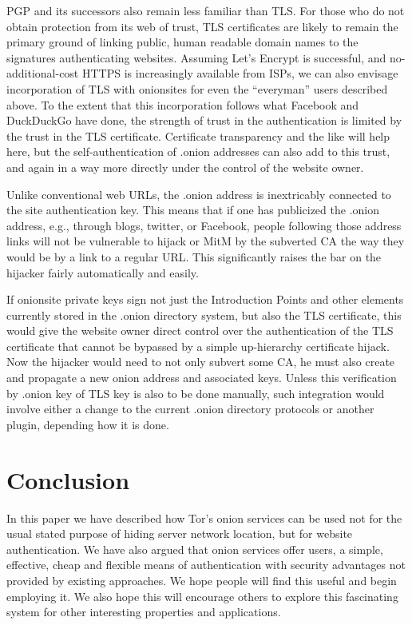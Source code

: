 \documentclass[10pt, conference, compsocconf]{styles/IEEEtran}
\begin{document}
PGP and its successors also remain less familiar than TLS. For those
who do not obtain protection from its web of trust, TLS certificates
are likely to remain the primary ground of linking public, human
readable domain names to the signatures authenticating
websites. Assuming Let's Encrypt is successful, and no-additional-cost
HTTPS is increasingly available from ISPs, we can also
envisage incorporation of TLS with onionsites for even the
``everyman'' users described above.  To the extent that this
incorporation follows what Facebook and DuckDuckGo have done, the
strength of trust in the authentication is limited by the trust in the
TLS certificate. Certificate transparency and the
like will help here, but the self-authentication of .onion addresses
can also add to this trust, and again in a way more directly under the
control of the website owner.

Unlike conventional web URLs, the .onion address is inextricably connected to
the site authentication key. This means that if one has publicized the
.onion address, e.g., through blogs, twitter, or Facebook, people
following those address links will not be vulnerable to hijack or MitM
by the subverted CA the way they would be by a link to a regular
URL\@. This significantly raises the bar on the hijacker fairly
automatically and easily.

If onionsite private keys sign not just the Introduction Points and
other elements currently stored in the .onion directory system, but
also the TLS certificate, this would give the website owner direct
control over the authentication of the TLS certificate that cannot be
bypassed by a simple up-hierarchy certificate hijack. Now the hijacker
would need to not only subvert some CA, he must also create and
propagate a new onion address and associated keys. Unless this
verification by .onion key of TLS key is also to be done manually,
such integration would involve either a change to the current .onion directory
protocols or another plugin, depending how it is done.

\section{Conclusion}

In this paper we have described how Tor's onion services can be used
not for the usual stated purpose of hiding server network location,
but for website authentication.  We have also argued that onion
services offer users, a simple, effective, cheap and flexible means of
authentication with security advantages not provided by existing
approaches. We hope people will find this useful and begin employing
it. We also hope this will encourage others to explore this
fascinating system for other interesting properties and applications.
\end{document}
